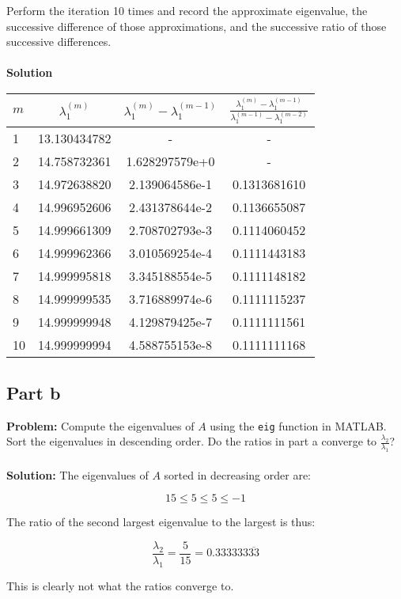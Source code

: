 \documentclass{article}
\begin{document}
Perform the iteration 10 times and record the approximate eigenvalue, the successive difference of those approximations, and the successive ratio of those successive differences.
\\\\
\textbf{Solution}
\begin{center}
\begin{tabular}{l|c|c|c}
      $m$ & $\lambda_1^{(m)}$ & $\lambda_1^{(m)}-\lambda_1^{(m-1)}$ & $\frac{\lambda_1^{(m)}-\lambda_1^{(m-1)}}{\lambda_1^{(m-1)}-\lambda_1^{(m-2)}}$ \\
      \hline
      1& 13.130434782 & - &-\\
      2& 14.758732361 & 1.628297579e+0 &-\\
      3& 14.972638820 & 2.139064586e-1 &0.1313681610\\
      4& 14.996952606 & 2.431378644e-2 &0.1136655087\\
      5& 14.999661309 & 2.708702793e-3 &0.1114060452\\
      6& 14.999962366 & 3.010569254e-4 &0.1111443183\\
      7& 14.999995818 & 3.345188554e-5 &0.1111148182\\
      8& 14.999999535 & 3.716889974e-6 &0.1111115237\\
      9& 14.999999948 & 4.129879425e-7 &0.1111111561\\
      10& 14.999999994 & 4.588755153e-8 &0.1111111168\\
\end{tabular}
\end{center}

\subsection*{Part b}
\textbf{Problem:} Compute the eigenvalues of $A$ using the \verb|eig| function in MATLAB. Sort the eigenvalues in descending order. Do the ratios in part a converge to $\frac{\lambda_2}{\lambda_1}$?
\\\\
\textbf{Solution:} The eigenvalues of $A$ sorted in decreasing order are:

$$15\le5\le5\le-1$$

The ratio of the second largest eigenvalue to the largest is thus:

$$\frac{\lambda_2}{\lambda_1}=\frac{5}{15}=0.333333\overline{33}$$

This is clearly not what the ratios converge to.
\end{document}
